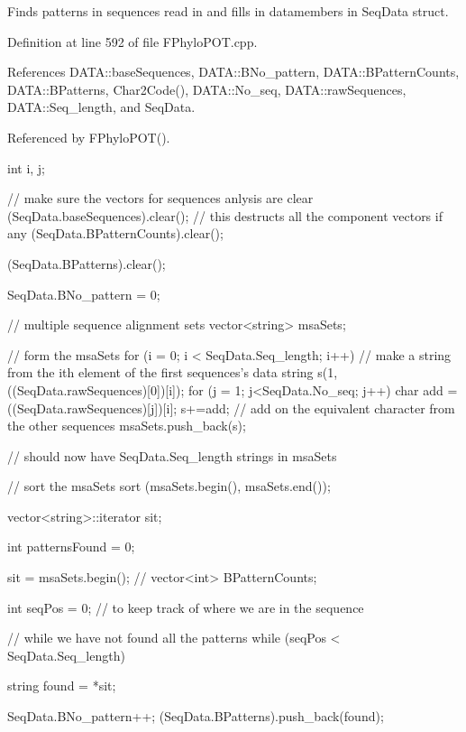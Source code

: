 \-Finds patterns in sequences read in and fills in datamembers in \-Seq\-Data struct. 



\-Definition at line 592 of file \-F\-Phylo\-P\-O\-T.\-cpp.



\-References \-D\-A\-T\-A\-::base\-Sequences, \-D\-A\-T\-A\-::\-B\-No\-\_\-pattern, \-D\-A\-T\-A\-::\-B\-Pattern\-Counts, \-D\-A\-T\-A\-::\-B\-Patterns, \-Char2\-Code(), \-D\-A\-T\-A\-::\-No\-\_\-seq, \-D\-A\-T\-A\-::raw\-Sequences, \-D\-A\-T\-A\-::\-Seq\-\_\-length, and \-Seq\-Data.



\-Referenced by \-F\-Phylo\-P\-O\-T().


\begin{DoxyCode}
{
  int i, j;

  // make sure the vectors for sequences anlysis are clear
  (SeqData.baseSequences).clear();
  //  this destructs all the component vectors if any
  (SeqData.BPatternCounts).clear();

  (SeqData.BPatterns).clear();

  SeqData.BNo_pattern = 0;

  // multiple sequence alignment sets
  vector<string> msaSets;

  // form the msaSets
  for (i = 0; i < SeqData.Seq_length; i++)
  {
    // make a string from the ith element of the first sequences's data
    string s(1, ((SeqData.rawSequences)[0])[i]);
    for (j = 1; j<SeqData.No_seq; j++)
    {
      char add = ((SeqData.rawSequences)[j])[i];
      s+=add;       // add on the equivalent character from the other sequences
    }
    msaSets.push_back(s);
  }

  // should now have SeqData.Seq_length strings in msaSets

                    // sort the msaSets
  sort (msaSets.begin(), msaSets.end());

  vector<string>::iterator sit;

  int patternsFound = 0;

  sit = msaSets.begin();
  // vector<int> BPatternCounts;

  int seqPos = 0;   // to keep track of where we are in the sequence

  // while we have not found all the patterns
  while (seqPos < SeqData.Seq_length)
  {
    string found = *sit;

    SeqData.BNo_pattern++;
    (SeqData.BPatterns).push_back(found);

}}
\end{DoxyCode}
